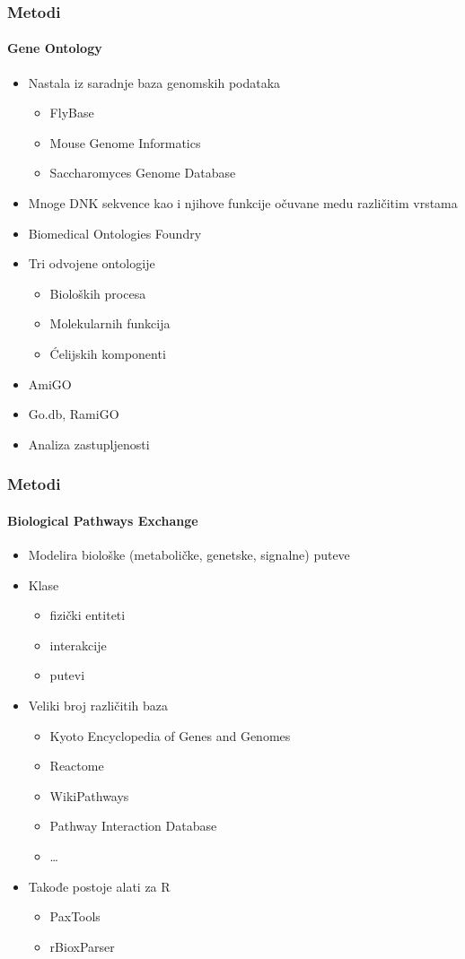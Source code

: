 \documentclass[xetex,mathserif,serif]{beamer}
\begin{document}
  \begin{frame}
    \frametitle{Metodi}
    	\framesubtitle{Gene Ontology}	
		\begin{center}		
		\begin{itemize}
			\item Nastala iz saradnje baza genomskih podataka
				\begin{itemize}
					\item FlyBase
					\item Mouse Genome Informatics
					\item Saccharomyces Genome Database
				\end{itemize}
			\item Mnoge DNK sekvence kao i njihove funkcije očuvane medu različitim vrstama
			\item Biomedical Ontologies Foundry
			\item Tri odvojene ontologije
				\begin{itemize}
					\item Bioloških procesa
					\item Molekularnih funkcija
					\item Ćelijskih komponenti
				\end{itemize}
			\item AmiGO
			\item Go.db, RamiGO
			\item Analiza zastupljenosti
		\end{itemize}
	\end{center}
  \end{frame}  
  \begin{frame}
    \frametitle{Metodi}
    	\framesubtitle{Biological Pathways Exchange}	
		\begin{center}		
		\begin{itemize}
			\item Modelira biološke (metaboličke, genetske, signalne) puteve
			\item Klase
				\begin{itemize}
					\item fizički entiteti
					\item interakcije
					\item putevi
				\end{itemize}
			\item Veliki broj različitih baza
				\begin{itemize}
					\item Kyoto Encyclopedia of Genes and Genomes
					\item Reactome
					\item WikiPathways
					\item Pathway Interaction Database
					\item \dots
				\end{itemize}
			\item Takođe postoje alati za R
				\begin{itemize}
					\item PaxTools
					\item rBioxParser
				\end{itemize}
		\end{itemize}
	\end{center}
  \end{frame}  
\end{document}
